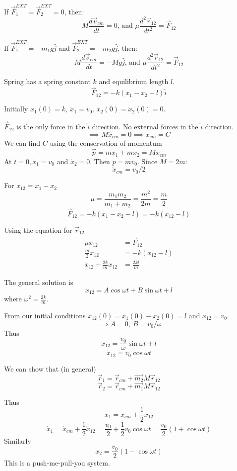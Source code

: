 \documentclass[10pt]{scrartcl}
\begin{document}
If $\vec{F}_1^{EXT} = \vec{F}^{EXT}_2 = 0$, then: \[M\dfrac{d\vec{v}_{cm}}{dt} = 0\text{, and }\mu\dfrac{d^2\vec{r}_{12}}{dt^2}  = \vec{F}_{12}\]

If $\vec{F}_1^{EXT} = -m_1g\hat{j}$ and $\vec{F}^{EXT}_2 = -m_2g\hat{j}$, then: \[M\dfrac{d\vec{v}_{cm}}{dt} = -Mg\hat{j}\text{, and }\mu\dfrac{d^2\vec{r}_{12}}{dt^2}  = \vec{F}_{12}\]\vsp

\begin{example}[Spring]
\vspace*{50pt}

Spring has a spring constant $k$ and equilibrium length $l$. 
\[\vec{F}_{12} = -k(x_1 - x_2 - l)\hat{i}\]

Initially $x_1(0) = k,~ \dot{x}_1 = v_0$. $x_2(0) = \dot{x}_2(0) = 0$.

$\vec{F}_{12}$ is the only force in the $\hat{i}$ direction. No external forces in the $\hat{i}$ direction. 
\[\implies M\ddot{x}_{cm} = 0 \implies \dot{x}_{cm} = C\]
We can find $C$ using the conservation of momentum
\[\vec{p} = m\dot{x}_1 + m\dot{x}_2 = M\dot{x}_{cm}\]
At $t = 0, \dot{x}_1 = v_0$ and $\dot{x}_2 = 0$. Then $p = mv_0$. Since $M = 2m$:
\[\dot{x}_{cm} = v_0/2\]

For $x_{12} = x_1 - x_2$
\[\mu = \frac{m_1m_2}{m_1 + m_2} = \frac{m^2}{2m} = \frac{m}{2}\]
\[\vec{F}_{12} = -k(x_1 - x_2 - l) = -k(x_{12} - l)\]

Using the equation for $\vec{r}_{12}$
\[\begin{aligned}\mu\ddot{x}_{12} &= \vec{F}_{12}\\
\frac{m}{2}\ddot{x}_{12} &= -k(x_{12} - l)\\
\ddot{x}_{12} + \frac{2k}{m}x_{12} &= \frac{2kl}{m}	
\end{aligned}
\]

The general solution is 
\[x_{12} = A\cos\omega t + B\sin\omega t + l\]
where $\omega^2 = \frac{2k}{m}$. 

From our initial conditions $x_{12}(0) = x_1(0) - x_2(0) = l$ and $\dot{x}_{12} = v_0$. 
\[\implies A = 0,~B = v_0/\omega\]Thus
\[x_{12} = \frac{v_0}{\omega}\sin\omega t + l\]
\[\dot{x}_{12} = v_0\cos\omega t\]

We can show that (in general)
\[\vec{r}_1 = \vec{r}_{cm} + \vec{m_2}{M}\vec{r}_{12}\]
\[\vec{r}_2 = \vec{r}_{cm} + \vec{m_1}{M}\vec{r}_{12}\]

Thus
\[x_1 = x_{cm} + \frac{1}{2}x_{12}\]
\[\dot{x}_1 = \dot{x}_{cm} + \frac{1}{2}\dot{x}_{12} = \frac{v_0}{2} + \frac{1}{2}v_0\cos\omega t = \frac{v_0}{2}(1+\cos\omega t)\]
Similarly 
\[\dot{x}_2 =  \frac{v_0}{2}(1 - \cos\omega t)\]
This is a push-me-pull-you system.
\end{example}
\end{document}
